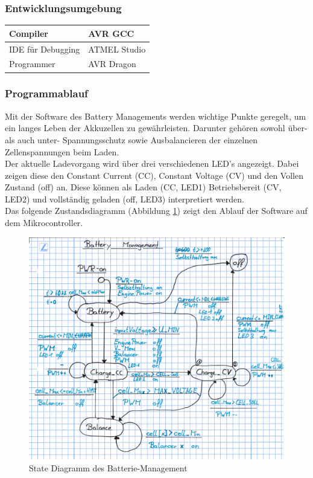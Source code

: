 \subsubsection*{Entwicklungsumgebung}
\begin{center}
	\begin{tabular}{  l | l  }
		\hline
		Compiler & AVR GCC \\ \hline
		IDE für Debugging & ATMEL Studio \\ \hline
		Programmer & AVR Dragon \\ 
		\hline
	\end{tabular}
\end{center}

\subsubsection*{Programmablauf}
\label{SW_Stromversorgung}
Mit der Software des Battery Managements werden wichtige Punkte geregelt, um ein langes Leben der Akkuzellen zu gewährleisten. Darunter gehören sowohl über- als auch unter- Spannungsschutz sowie Ausbalancieren der einzelnen Zellenspannungen beim Laden. \\
Der aktuelle Ladevorgang wird über drei verschiedenen LED’s angezeigt. Dabei zeigen diese den Constant Current (CC), Constant Voltage (CV) und den Vollen Zustand (off) an. Diese können als Laden (CC, LED1) Betriebsbereit (CV, LED2) und vollständig geladen (off, LED3) interpretiert werden. \\
Das folgende Zustandsdiagramm (Abbildung \ref{fig:statediagrammbatterie}) zeigt den Ablauf der Software auf dem Mikrocontroller.
\begin{figure} [H]
	\centering
	\includegraphics[width=1\linewidth]{images/Statediagramm_Batterie}
	\caption{State Diagramm des Batterie-Management}
	\label{fig:statediagrammbatterie}
\end{figure}
